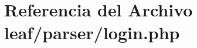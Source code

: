 \hypertarget{login_8php}{\section{Referencia del Archivo leaf/parser/login.php}
\label{login_8php}
}
